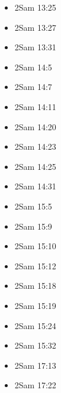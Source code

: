\documentclass[14pt]{book}
\begin{document}
\begin{multicols}{2}
\begin{itemize}
							\item 2Sam 13:25
							
							\item 2Sam 13:27
							
							\item 2Sam 13:31
							
							\item 2Sam 14:5
							
							\item 2Sam 14:7
							
							\item 2Sam 14:11
							
							\item 2Sam 14:20
							
							\item 2Sam 14:23
							
							\item 2Sam 14:25
							
							\item 2Sam 14:31
							
							\item 2Sam 15:5
							
							\item 2Sam 15:9
							
							\item 2Sam 15:10
							
							\item 2Sam 15:12
							
							\item 2Sam 15:18
							
							\item 2Sam 15:19
							
							\item 2Sam 15:24
							
							\item 2Sam 15:32
							
							\item 2Sam 17:13
							
							\item 2Sam 17:22
							

\end{itemize}
\end{multicols}
\end{document}
